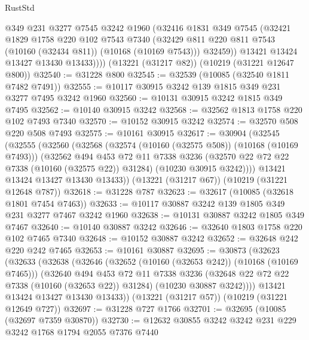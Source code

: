 \begin{lexlean}{RustStd}
\begin{coremodule}
            @349
            @231
            @3277
            @7545
            @3242
            @1960
            (@32416
              @1831
              @349
              @7545
              (@32421
                @1829
                @1758
                @220
                @102
                @7543
                @7340
                (@32429 @811 @220 @811 @7543 (@10160 (@32434 @811)) (@10168 (@10169 @7543)))
                @32459))
            @13421
            @13424
            @13427
            @13430
            @13433))))
    (@13221 (@31217 @82))
    (@10219 (@31221 @12647 @800))
@32540 := @31228 @800
@32545 := @32539 (@10085 (@32540 @1811 @7482 @7491))
@32555 := @10117 @30915 @3242 @139 @1815 @349 @231 @3277 @7495 @3242 @1960
@32560 := @10131 @30915 @3242 @1815 @349 @7495
@32562 := @10140 @30915 @3242
@32568 := @32562 @1813 @1758 @220 @102 @7493 @7340
@32570 := @10152 @30915 @3242
@32574 := @32570 @508 @220 @508 @7493
@32575 := @10161 @30915
@32617 := @30904
    (@32545
      (@32555
        (@32560
          (@32568
            (@32574 (@10160 (@32575 @508)) (@10168 (@10169 @7493)))
            (@32562
              @494
              @453
              @72
              @11
              @7338
              @3236
              (@32570 @22 @72 @22 @7338 (@10160 (@32575 @22)) @31284)
              (@10230 @30915 @3242))))
        @13421
        @13424
        @13427
        @13430
        @13433))
    (@13221 (@31217 @67))
    (@10219 (@31221 @12648 @787))
@32618 := @31228 @787
@32623 := @32617 (@10085 (@32618 @1801 @7454 @7463))
@32633 := @10117 @30887 @3242 @139 @1805 @349 @231 @3277 @7467 @3242 @1960
@32638 := @10131 @30887 @3242 @1805 @349 @7467
@32640 := @10140 @30887 @3242
@32646 := @32640 @1803 @1758 @220 @102 @7465 @7340
@32648 := @10152 @30887 @3242
@32652 := @32648 @242 @220 @242 @7465
@32653 := @10161 @30887
@32695 := @30873
    (@32623
      (@32633
        (@32638
          (@32646
            (@32652 (@10160 (@32653 @242)) (@10168 (@10169 @7465)))
            (@32640
              @494
              @453
              @72
              @11
              @7338
              @3236
              (@32648 @22 @72 @22 @7338 (@10160 (@32653 @22)) @31284)
              (@10230 @30887 @3242))))
        @13421
        @13424
        @13427
        @13430
        @13433))
    (@13221 (@31217 @57))
    (@10219 (@31221 @12649 @727))
@32697 := @31228 @727 @1766
@32701 := @32695 (@10085 (@32697 @7359 @30870))
@32730 := @12632
    @30855
    @3242
    @3242
    @231
    @229
    @3242
    @1768
    @1794
    @2055
    @7376
    @7440

\end{coremodule}
\end{lexlean}

